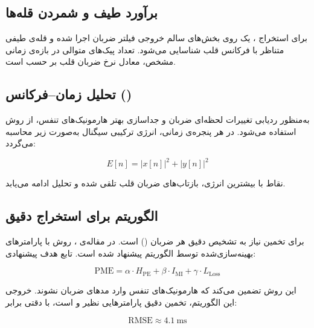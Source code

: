 \subsection{برآورد طیف و شمردن قله‌ها}
\label{sec:peak-counting}

برای استخراج ، یک  روی بخش‌های سالم خروجی فیلتر ضربان اجرا شده و قله‌ی طیفی متناظر با فرکانس قلب شناسایی می‌شود. تعداد پیک‌های متوالی در بازه‌ی زمانی مشخص، معادل نرخ ضربان قلب بر حسب  است.

\subsection{تحلیل زمان–فرکانس ()}
\label{sec:stft}

به‌منظور ردیابی تغییرات لحظه‌ای ضربان و جداسازی بهتر هارمونیک‌های تنفس، از روش  استفاده می‌شود. در هر پنجره‌ی زمانی، انرژی ترکیبی سیگنال به‌صورت زیر محاسبه می‌گردد:

\begin{equation}
E[n] = |x[n]|^2 + |y[n]|^2
\label{eq:stft_energy}
\end{equation}

نقاط با بیشترین انرژی، بازتاب‌های ضربان قلب تلقی شده و تحلیل ادامه می‌یابد.

\subsection{الگوریتم  برای استخراج دقیق }
\label{sec:health-vmd}

برای تخمین  نیاز به تشخیص دقیق هر ضربان () است. در مقاله‌ی ، روش  با پارامترهای بهینه‌سازی‌شده توسط الگوریتم  پیشنهاد شده است. تابع هدف پیشنهادی:

\begin{equation}
\text{PME} = \alpha \cdot H_{\text{PE}} + \beta \cdot I_{\text{MI}} + \gamma \cdot L_{\text{Loss}}
\label{eq:pme_objective}
\end{equation}

این روش تضمین می‌کند که هارمونیک‌های تنفس وارد مدهای ضربان نشوند. خروجی این الگوریتم، تخمین دقیق پارامترهایی نظیر  و  است، با دقتی برابر:

\begin{equation}
\mathrm{RMSE} \approx 4.1\ \mathrm{ms}
\label{eq:rmse_sdnn}
\end{equation}


